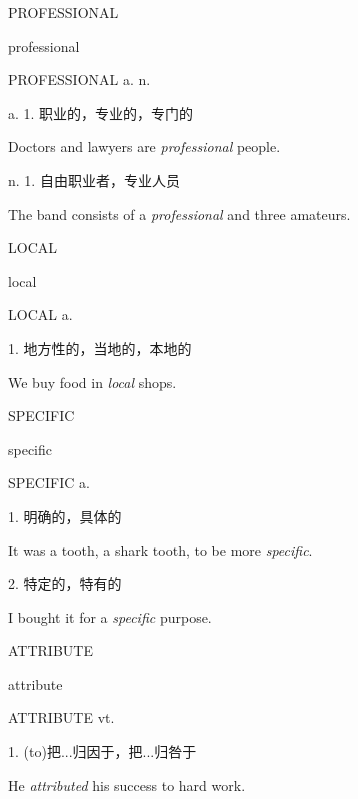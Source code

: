 \begin{flashcard}{
PROFESSIONAL

professional
}
\begin{center}
PROFESSIONAL a. n. 
\end{center}
a. 1. 职业的，专业的，专门的

Doctors and lawyers are \textit{professional} people.

n. 1. 自由职业者，专业人员

The band consists of a \textit{professional} and three amateurs.

\end{flashcard}
\begin{flashcard}{
LOCAL

local
}
\begin{center}
LOCAL a. 
\end{center}
1. 地方性的，当地的，本地的

We buy food in \textit{local} shops.

\end{flashcard}
\begin{flashcard}{
SPECIFIC

specific
}
\begin{center}
SPECIFIC a. 
\end{center}
1. 明确的，具体的

It was a tooth, a shark tooth, to be more \textit{specific}.

2. 特定的，特有的

I bought it for a \textit{specific} purpose.

\end{flashcard}
\begin{flashcard}{
ATTRIBUTE

attribute
}
\begin{center}
ATTRIBUTE vt. 
\end{center}
1. (to)把...归因于，把...归咎于

He \textit{attributed} his success to hard work.

\end{flashcard}
